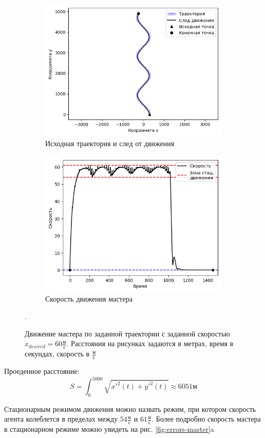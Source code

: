 \documentclass[12pt,a4paper]{article}
\begin{document}
\begin{figure}[!htbp]
	\centering
	\begin{subfigure}{.5\textwidth}
		\centering
		\includegraphics[width=1\linewidth]{master-trajectory-0}
		\caption{Исходная траектория и след от движения}
		\label{fig:sub1}
	\end{subfigure}%
	\begin{subfigure}{.5\textwidth}
		\centering
		\includegraphics[width=1\linewidth]{master-trajectory-0-velocity}
		\caption{Скорость движения мастера}
		\label{fig:sub2}
	\end{subfigure}
	\caption{Движение мастера по заданной траектории с заданной скоростью $\dot{x}_{desired} = 60 \frac{\text{м}}{\text{с}}$. Расстояния на рисунках задаются в метрах, время в секундах, скорость в $\frac{\text{м}}{\text{с}}$}.
	\label{fig:test}
\end{figure}
Проеденное расстояние:
$$ S = \int_{0}^{5000} \sqrt{x'^2(t) + y'^2(t)} \approx 6051 \text{м} $$
\par
Стационарным режимом движения можно назвать режим, при котором скорость агента колеблется в пределах между $54\frac{\text{м}}{\text{с}}$ и $61\frac{\text{м}}{\text{с}}$. Более подробно скорость мастера в стационарном режиме можно увидеть на рис. \ref{fig:errors-master}a
\end{document}
